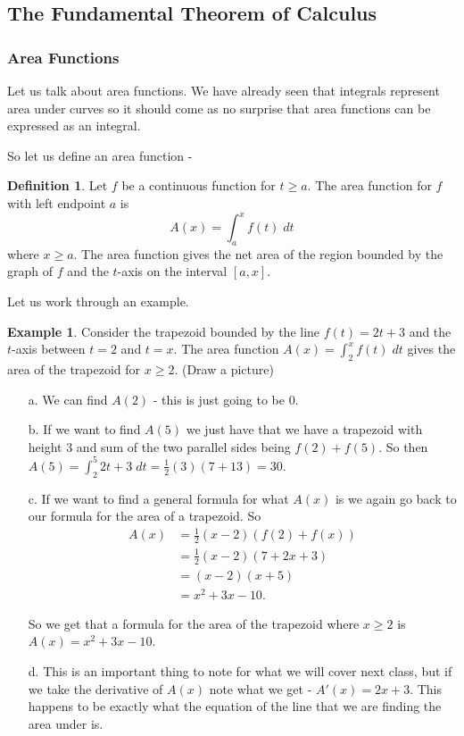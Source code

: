 \documentclass[12pt,reqno]{article}
\theoremstyle{definition}
\newtheorem*{Definition}{Definition}
\newtheorem*{Example}{Example}
\begin{document}
\subsection{The Fundamental Theorem of Calculus} 

\subsubsection{Area Functions}

Let us talk about area functions. We have already seen that integrals represent area under curves so it should come as no surprise that area functions can be expressed as an integral. 

So let us define an area function - 
\begin{Definition}
	Let $f$ be a continuous function for $t \geq a$. The area function for $f$ with left endpoint $a$ is $$A(x) = \int_{a}^{x} f(t) \; dt$$ where $x \geq a$. The area function gives the net area of the region bounded by the graph of $f$ and the $t$-axis on the interval $[a, x]$. 
\end{Definition}

Let us work through an example. 
\begin{Example}
	Consider the trapezoid bounded by the line $f(t) = 2t + 3$ and the $t$-axis between $t = 2$ and $t = x$. The area function $A(x) = \int_{2}^{x} f(t) \; dt$ gives the area of the trapezoid for $x \geq 2$. (Draw a picture)
	
	\begin{enumerate}
		\item[a.] We can find $A(2)$ - this is just going to be 0. 
		\item[b.] If we want to find $A(5)$ we just have that we have a trapezoid with height $3$ and sum of the two parallel sides being $f(2) + f(5)$. So then $A(5) = \int_{2}^{5} 2t + 3 \; dt = \frac{1}{2}(3)(7 + 13) = 30$. 
		\item[c.] If we want to find a general formula for what $A(x)$ is we again go back to our formula for the area of a trapezoid. So 
		\begin{align*}
			A(x) &= \frac{1}{2} (x - 2) (f(2) + f(x)) \\
				 &= \frac{1}{2} (x - 2) (7 + 2x + 3) \\
				 &= (x - 2) (x + 5) \\
				 &= x^2 + 3x - 10.
		\end{align*}
	
		So we get that a formula for the area of the trapezoid where $x \geq 2$ is $A(x) = x^2 + 3x - 10$. 
		\item[d.] This is an important thing to note for what we will cover next class, but if we take the derivative of $A(x)$ note what we get - $A'(x) = 2x + 3$. This happens to be exactly what the equation of the line that we are finding the area under is. 
	\end{enumerate}
\end{Example}
\end{document}
